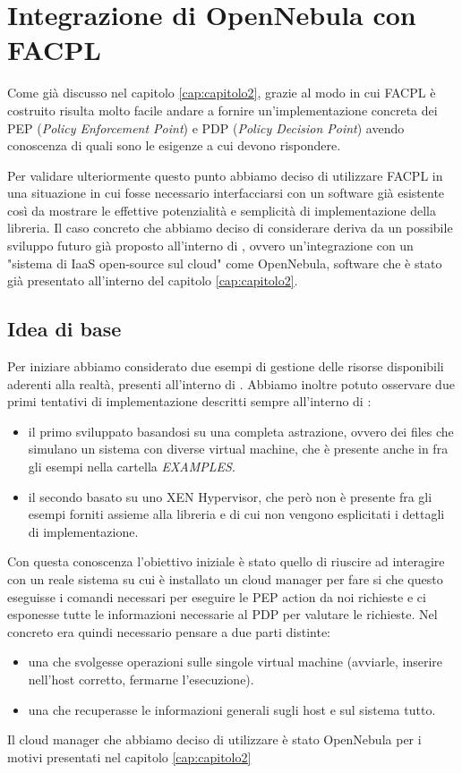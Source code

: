 
\chapter{Integrazione di OpenNebula con FACPL}
\label{cap:capitolo3}
Come già discusso nel capitolo \ref{cap:capitolo2}, grazie al modo in cui FACPL\cite{facpl} è costruito risulta molto facile andare a fornire un'implementazione concreta dei PEP (\emph{Policy Enforcement Point}) e PDP (\emph{Policy Decision Point}) avendo conoscenza  di quali sono le esigenze a cui devono rispondere.\par
Per validare ulteriormente questo punto abbiamo deciso di utilizzare FACPL in una situazione in cui fosse necessario interfacciarsi con un software già esistente così da mostrare le effettive potenzialità e semplicità di implementazione della libreria.
Il caso concreto che abbiamo deciso di considerare deriva da un possibile sviluppo futuro già proposto all'interno di \cite{10.1007/978-3-319-08260-8_6}, ovvero un'integrazione con un "sistema di IaaS open-source sul cloud" come OpenNebula\cite{opennebula}, software che è stato già presentato all'interno del capitolo \ref{cap:capitolo2}.

\section{Idea di base}
Per iniziare abbiamo considerato due esempi di gestione delle risorse disponibili aderenti alla realtà, presenti all'interno di \cite{10.1007/978-3-319-08260-8_6}.
Abbiamo inoltre potuto osservare due primi tentativi di implementazione descritti sempre all'interno di \cite{10.1007/978-3-319-08260-8_6}:
\begin{itemize}
    \item il primo sviluppato basandosi su una completa astrazione, ovvero dei files che simulano un sistema con diverse virtual machine, che è presente anche in \cite{facpl-github} fra gli esempi nella cartella \emph{EXAMPLES}.
    \item il secondo basato su uno XEN Hypervisor, che però non è presente fra gli esempi forniti assieme alla libreria e di cui non vengono esplicitati i dettagli di implementazione.
\end{itemize}
Con questa conoscenza l'obiettivo iniziale è stato quello di riuscire ad interagire con un reale sistema su cui è installato un cloud manager per fare si che questo eseguisse i comandi necessari per eseguire le PEP action da noi richieste e ci esponesse tutte le informazioni necessarie al PDP per valutare le richieste.
Nel concreto era quindi necessario pensare a due parti distinte:
\begin{itemize}
    \item una che svolgesse operazioni sulle singole virtual machine (avviarle, inserire nell'host corretto, fermarne l'esecuzione).
    \item una che recuperasse le informazioni generali sugli host e sul sistema tutto.
\end{itemize}
Il cloud manager che abbiamo deciso di utilizzare è stato OpenNebula per i motivi presentati nel capitolo \ref{cap:capitolo2}

